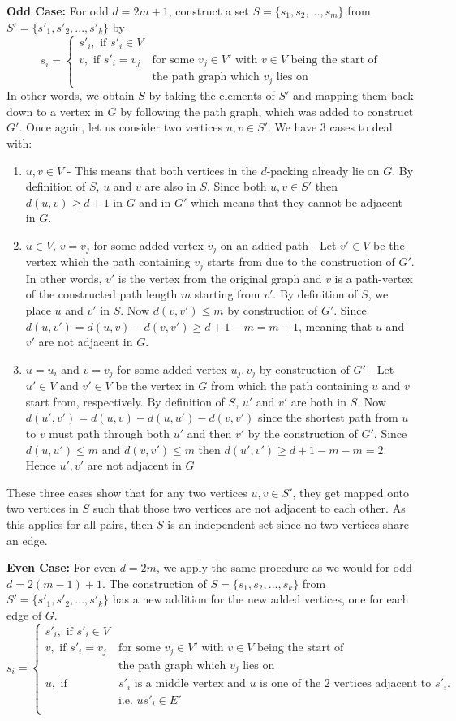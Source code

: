 \documentclass[10pt, a4paper]{article}
\theoremstyle{definition}
\newcommand{\n}{\\}
\begin{document}
\textbf{Odd Case:} For odd $d = 2m+1$, construct a set $S = \{s_1, s_2, ..., s_m\}$ from $S' = \{s'_1, s'_2, ... ,s'_k\}$ by
\[ s_i = \begin{cases}
	s'_i, \text{ if } s'_i \in V & \n
	v, \text{ if }  s'_i = v_j & \text{for some } v_j \in V' \text{ with $v \in V$ being the start of} \n & \text{the path graph which $v_j$ lies on}
\end{cases}\]
In other words, we obtain $S$ by taking the elements of $S'$ and mapping them back down to a vertex in $G$ by following the path graph, which was added to construct $G'$. Once again, let us consider two vertices $u,v \in S'$. We have 3 cases to deal with:
\begin{enumerate}
	\item $u,v \in V$ - This means that both vertices in the $d$-packing already lie on $G$. By definition of $S$, $u$ and $v$ are also in $S$. Since both $u,v \in S'$ then $d(u,v) \geq d+1$ in $G$ and in $G'$ which means that they cannot be adjacent in $G$.
	\item $u \in V$, $v = v_j$ for some added vertex $v_j$ on an added path - Let $v' \in V$ be the vertex which the path containing $v_j$ starts from due to the construction of $G'$. In other words, $v'$ is the vertex from the original graph and $v$ is a path-vertex of the constructed path length $m$ starting from $v'$. By definition of $S$, we place $u$ and $v'$ in $S$. Now $d(v,v') \leq m$ by construction of $G'$. Since $d(u,v') = d(u,v) - d(v,v') \geq d + 1 - m = m + 1$, meaning that $u$ and $v'$ are not adjacent in $G$.
	\item $u = u_i$ and $v = v_j$ for some added vertex $u_j,v_j$ by construction of $G'$ -  Let $u' \in V$ and $v' \in V$ be the vertex in $G$ from which the path containing $u$ and $v$ start from, respectively. By definition of $S$, $u'$ and $v'$ are both in $S$. Now $d(u',v') = d(u,v) - d(u,u') - d(v,v')$ since the shortest path from $u$ to $v$ must path through both $u'$ and then $v'$ by the construction of $G'$. Since $d(u,u') \leq m$ and $d(v,v') \leq m$ then $d(u',v') \geq d + 1 - m - m = 2$. Hence $u', v'$ are not adjacent in $G$
\end{enumerate}
These three cases show that for any two vertices $u,v \in S'$, they get mapped onto two vertices in $S$ such that those two vertices are not adjacent to each other. As this applies for all pairs, then $S$ is an independent set since no two vertices share an edge.

\textbf{Even Case:} For even $d = 2m$, we apply the same procedure as we would for odd $d = 2(m-1) + 1$. The construction of $S = \{s_1,s_2,...,s_k\}$ from $S' = \{s'_1,s'_2,...,s'_k\}$ has a new addition for the new added vertices, one for each edge of $G$.
\[ s_i = \begin{cases}
	s'_i, \text{ if } s'_i \in V & \n
	v, \text{ if }  s'_i = v_j & \text{for some } v_j \in V' \text{ with $v \in V$ being the start of} \n & \text{the path graph which $v_j$ lies on} \n
	u, \text{ if } & s'_i \text{ is a middle vertex and $u$ is one of the 2 vertices adjacent to $s'_i$}. \n
	& \text{i.e. } us'_i \in E' \n
\end{cases}\]
\end{document}
